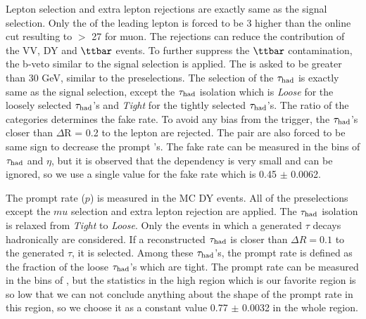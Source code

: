 Lepton selection and extra lepton rejections are exactly same as the signal selection. Only the \pt of the %
leading lepton is forced to 
be 3 \GeV higher than the online cut resulting to \pt $>$ 27 \GeV for muon.%
The rejections can reduce the contribution of the VV, DY and $\ttbar$ events. To further suppress the $\ttbar$ contamination, the b-veto 
similar to the signal selection is applied. The \MET is asked to be greater than 30 GeV, similar to the preselections. The selection of the $\tau_{\rm had}$ is exactly same as the signal selection, except the $\tau_{\rm had}$ isolation which is {\it Loose} for the loosely selected $\tau_{\rm had}$'s and {\it Tight} for the tightly selected $\tau_{\rm had}$'s. 
The ratio of the  categories determines the fake rate. To avoid any bias from the trigger, the $\tau_{\rm had}$'s closer than $\Delta$R = 0.2 to the 
lepton are rejected. The \muTau pair are also forced to be same sign to decrease the prompt \Tau's.
The fake rate can be measured in the bins of $\tau_{\rm had}$ \pt and $\eta$, but it is observed that the dependency is very small and can be ignored, 
so we use a single value for the fake rate which is 0.45 $\pm$ 0.0062.

The prompt rate ($p$) is measured in the MC DY events. All of the preselections except the $mu$ selection and extra lepton rejection %
are applied. 
The $\tau_{\rm had}$ isolation 
is relaxed from {\it Tight} to {\it Loose}. Only the events in which a generated $\tau$ decays hadronically are considered. If a reconstructed $\tau_{\rm had}$ is 
closer than $\Delta R = 0.1$ to the generated $\tau$, it is selected. Among these $\tau_{\rm had}$'s, the prompt rate is defined as the fraction of the loose $\tau_{\rm had}$'s 
which are tight. The prompt rate can be measured in the bins of \mttwo, but the statistics in the high \mttwo region which is our favorite 
region is so low that we can not conclude anything about the shape of the prompt rate in this region, so we choose it as a constant value
0.77 $\pm$ 0.0032 in the whole \mttwo region.

